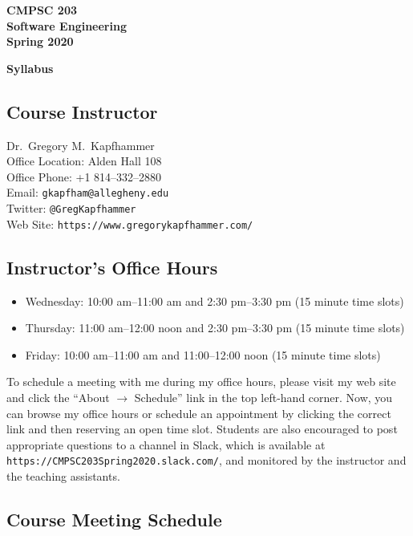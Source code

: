 \documentclass[11pt]{article}
\newcommand{\url}[1]{\lstinline{#1}}
\newcommand{\syllabustitle}[1]
{
  \begin{center}
    \begin{center}
      \bf
      CMPSC 203\\Software Engineering\\
      Spring 2020\\
      \medskip
    \end{center}
    \bf
    #1
  \end{center}
}
\begin{document}
\thispagestyle{empty}

\syllabustitle{Syllabus}

\vspace*{-1em}
\subsection*{Course Instructor}
Dr.\ Gregory M.\ Kapfhammer\\
\noindent Office Location: Alden Hall 108 \\
\noindent Office Phone: +1 814--332--2880 \\
\noindent Email: \url{gkapfham@allegheny.edu} \\
\noindent Twitter: \url{@GregKapfhammer} \\
\noindent Web Site: \url{https://www.gregorykapfhammer.com/}

\subsection*{Instructor's Office Hours}

\begin{itemize}

  \itemsep0em

  \item Wednesday: 10:00 am--11:00 am and 2:30 pm--3:30 pm (15 minute time slots)

  \item Thursday: 11:00 am--12:00 noon and 2:30 pm--3:30 pm (15 minute time slots)

  \item Friday: 10:00 am--11:00 am and 11:00--12:00 noon (15 minute time slots)

\end{itemize}

\noindent To schedule a meeting with me during my office hours, please visit my
web site and click the ``About $\rightarrow$ Schedule'' link in the top
left-hand corner. Now, you can browse my office hours or schedule an appointment
by clicking the correct link and then reserving an open time slot. Students are
also encouraged to post appropriate questions to a channel in Slack, which is
available at \url{https://CMPSC203Spring2020.slack.com/}, and monitored by the
instructor and the teaching assistants.

\subsection*{Course Meeting Schedule}
\end{document}
